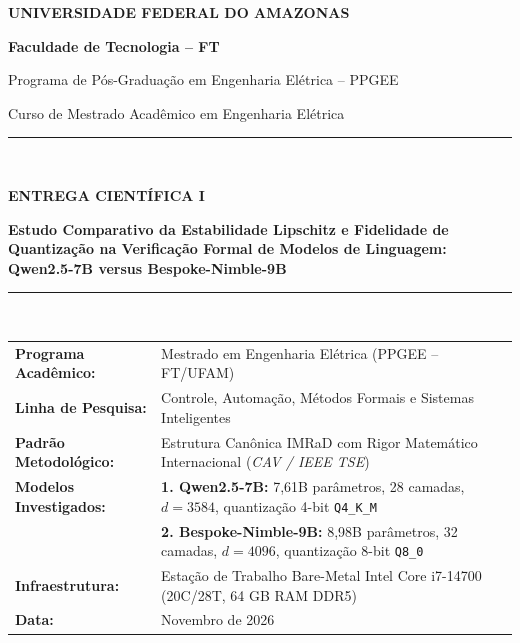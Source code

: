 \documentclass[11pt,a4paper]{article}
\theoremstyle{definition}
\begin{document}
\begin{titlepage}
    \centering
    \vspace*{0.4cm}
    {\Huge\bfseries\color{ufamblue} UNIVERSIDADE FEDERAL DO AMAZONAS \par}
    \vspace{0.25cm}
    {\Large\bfseries Faculdade de Tecnologia -- FT \par}
    {\large Programa de Pós-Graduação em Engenharia Elétrica -- PPGEE \par}
    {\normalsize Curso de Mestrado Acadêmico em Engenharia Elétrica \par}
    \vspace{1.0cm}
    
    \rule{\linewidth}{1.5pt} \\[0.4cm]
    {\large\bfseries ENTREGA CIENTÍFICA I \par}
    \vspace{0.25cm}
    {\LARGE\bfseries Estudo Comparativo da Estabilidade Lipschitz e Fidelidade de Quantização na Verificação Formal de Modelos de Linguagem: Qwen2.5-7B versus Bespoke-Nimble-9B \par}
    \rule{\linewidth}{1.5pt} \\[0.9cm]
    
    \begin{minipage}{0.96\textwidth}
        \small
        \begin{tabularx}{\linewidth}{l X}
            \textbf{Programa Acadêmico:} & Mestrado em Engenharia Elétrica (PPGEE -- FT/UFAM) \\
            \textbf{Linha de Pesquisa:} & Controle, Automação, Métodos Formais e Sistemas Inteligentes \\
            \textbf{Padrão Metodológico:} & Estrutura Canônica IMRaD com Rigor Matemático Internacional (\textit{CAV / IEEE TSE}) \\
            \textbf{Modelos Investigados:} & \textbf{1. Qwen2.5-7B:} 7,61B parâmetros, 28 camadas, $d=3584$, quantização 4-bit \texttt{Q4\_K\_M} \\
            & \textbf{2. Bespoke-Nimble-9B:} 8,98B parâmetros, 32 camadas, $d=4096$, quantização 8-bit \texttt{Q8\_0} \\
            \textbf{Infraestrutura:} & Estação de Trabalho Bare-Metal Intel Core i7-14700 (20C/28T, 64 GB RAM DDR5) \\
            \textbf{Data:} & Novembro de 2026
        \end{tabularx}
    \end{minipage}
    

\end{titlepage}
\end{document}
